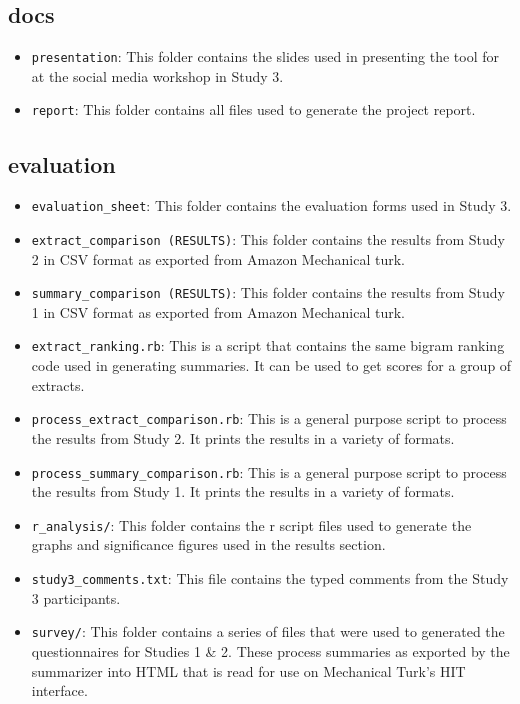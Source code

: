 \subsection*{docs}
  \begin{itemize}
    \item
      \texttt{presentation}: This folder contains the slides used in presenting the tool for at the social media workshop in Study 3.
    \item
      \texttt{report}: This folder contains all files used to generate the project report.
  \end{itemize}

\subsection*{evaluation}
  \begin{itemize}
    \item
      \texttt{evaluation\_sheet}: This folder contains the evaluation forms used in Study 3.
    \item
      \texttt{extract\_comparison\ (RESULTS)}: This folder contains the results from Study 2 in CSV format as exported from Amazon Mechanical turk.
    \item
      \texttt{summary\_comparison\ (RESULTS)}: This folder contains the results from Study 1 in CSV format as exported from Amazon Mechanical turk.
    \item
      \texttt{extract\_ranking.rb}: This is a script that contains the same bigram ranking code used in generating summaries. It can be used to get scores for a group of extracts.
    \item
      \texttt{process\_extract\_comparison.rb}: This is a general purpose script to process the results from Study 2. It prints the results in a variety of formats.
    \item
      \texttt{process\_summary\_comparison.rb}: This is a general purpose script to process the results from Study 1. It prints the results in a variety of formats.
    \item
      \texttt{r\_analysis/}: This folder contains the r script files used to generate the graphs and significance figures used in the results section.
    \item
      \texttt{study3\_comments.txt}: This file contains the typed comments from the Study 3 participants.
    \item
      \texttt{survey/}: This folder contains a series of files that were used to generated the questionnaires for Studies 1 \& 2. These process summaries as exported by the summarizer into HTML that is read for use on Mechanical Turk's HIT interface.
  \end{itemize}


